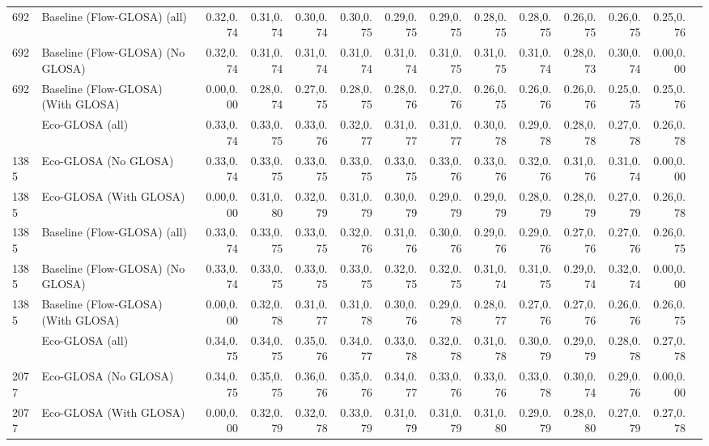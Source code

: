 \begin{table}[ht]
{\begin{tabular}{llrrrrrrrrrrrr}
        692  & Baseline (Flow-GLOSA) (all)        & 0.32,0.74 & 0.31,0.74 & 0.30,0.74 & 0.30,0.75 & 0.29,0.75 & 0.29,0.75 & 0.28,0.75 & 0.28,0.75 & 0.26,0.75 & 0.26,0.75 & 0.25,0.76 \\
        692  & Baseline (Flow-GLOSA) (No GLOSA)   & 0.32,0.74 & 0.31,0.74 & 0.31,0.74 & 0.31,0.74 & 0.31,0.74 & 0.31,0.75 & 0.31,0.75 & 0.31,0.74 & 0.28,0.73 & 0.30,0.74 & 0.00,0.00 \\
        692  & Baseline (Flow-GLOSA) (With GLOSA) & 0.00,0.00 & 0.28,0.74 & 0.27,0.75 & 0.28,0.75 & 0.28,0.76 & 0.27,0.76 & 0.26,0.75 & 0.26,0.76 & 0.26,0.76 & 0.25,0.75 & 0.25,0.76 \\
        \addlinespace
        1385 & Eco-GLOSA (all)                    & 0.33,0.74 & 0.33,0.75 & 0.33,0.76 & 0.32,0.77 & 0.31,0.77 & 0.31,0.77 & 0.30,0.78 & 0.29,0.78 & 0.28,0.78 & 0.27,0.78 & 0.26,0.78 \\
        1385 & Eco-GLOSA (No GLOSA)               & 0.33,0.74 & 0.33,0.75 & 0.33,0.75 & 0.33,0.75 & 0.33,0.75 & 0.33,0.76 & 0.33,0.76 & 0.32,0.76 & 0.31,0.76 & 0.31,0.74 & 0.00,0.00 \\
        1385 & Eco-GLOSA (With GLOSA)             & 0.00,0.00 & 0.31,0.80 & 0.32,0.79 & 0.31,0.79 & 0.30,0.79 & 0.29,0.79 & 0.29,0.79 & 0.28,0.79 & 0.28,0.79 & 0.27,0.79 & 0.26,0.78 \\
        1385 & Baseline (Flow-GLOSA) (all)        & 0.33,0.74 & 0.33,0.75 & 0.33,0.75 & 0.32,0.76 & 0.31,0.76 & 0.30,0.76 & 0.29,0.76 & 0.29,0.76 & 0.27,0.76 & 0.27,0.76 & 0.26,0.75 \\
        1385 & Baseline (Flow-GLOSA) (No GLOSA)   & 0.33,0.74 & 0.33,0.75 & 0.33,0.75 & 0.33,0.75 & 0.32,0.75 & 0.32,0.75 & 0.31,0.74 & 0.31,0.75 & 0.29,0.74 & 0.32,0.74 & 0.00,0.00 \\
        1385 & Baseline (Flow-GLOSA) (With GLOSA) & 0.00,0.00 & 0.32,0.78 & 0.31,0.77 & 0.31,0.78 & 0.30,0.76 & 0.29,0.78 & 0.28,0.77 & 0.27,0.76 & 0.27,0.76 & 0.26,0.76 & 0.26,0.75 \\
        \addlinespace
        2077 & Eco-GLOSA (all)                    & 0.34,0.75 & 0.34,0.75 & 0.35,0.76 & 0.34,0.77 & 0.33,0.78 & 0.32,0.78 & 0.31,0.78 & 0.30,0.79 & 0.29,0.79 & 0.28,0.78 & 0.27,0.78 \\
        2077 & Eco-GLOSA (No GLOSA)               & 0.34,0.75 & 0.35,0.75 & 0.36,0.76 & 0.35,0.76 & 0.34,0.77 & 0.33,0.76 & 0.33,0.76 & 0.33,0.78 & 0.30,0.74 & 0.29,0.76 & 0.00,0.00 \\
        2077 & Eco-GLOSA (With GLOSA)             & 0.00,0.00 & 0.32,0.79 & 0.32,0.78 & 0.33,0.79 & 0.31,0.79 & 0.31,0.79 & 0.31,0.80 & 0.29,0.79 & 0.28,0.80 & 0.27,0.79 & 0.27,0.78 \\

\end{tabular}}
\end{table}
